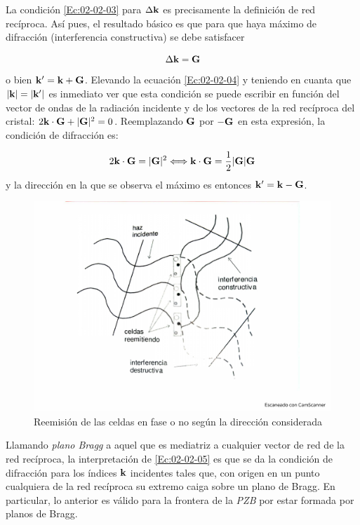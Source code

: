 La condición \ref{Ec:02-02-03} para $\Delta \mathbf{k}$ es precisamente la definición de red recíproca. Así pues, el resultado básico es que para que haya máximo de difracción (interferencia constructiva) se debe satisfacer 


\begin{equation}
    \Delta \mathbf{k} = \mathbf{G}\label{Ec:02-02-04}
\end{equation}
o bien $\mathbf{k}'=\mathbf{k}+\mathbf{G}$. Elevando la ecuación \ref{Ec:02-02-04} y teniendo en cuanta que $|\mathbf{k}|=|\mathbf{k}'|$ es inmediato ver que esta condición se puede escribir en función del vector de ondas de la radiación incidente y de los vectores de la red recíproca del cristal: $2\mathbf{k} \cdot \mathbf{G} + |\mathbf{G}|^2 = 0$. Reemplazando $\mathbf{G}$ por $-\mathbf{G}$ en esta expresión, la condición de difracción es: 

\begin{equation}
    2 \mathbf{k} \cdot \mathbf{G} = |\mathbf{G}|^2 \Longleftrightarrow \mathbf{k} \cdot \mathbf{G} = \frac{1}{2} |\mathbf{G}|  \mathbf{G}\label{Ec:02-02-05}
\end{equation}
y la dirección en la que se observa el máximo es entonces $\mathbf{k}'=\mathbf{k}-\mathbf{G}$. 


\begin{figure}[h!] \centering
    \includegraphics[scale=0.40]{Cuerpo/Ch_02/Fotos_libro 4.pdf}
    \caption{Reemisión de las celdas en fase o no según la dirección considerada}
    \label{Fig:02-04}
\end{figure}

Llamando \textit{plano Bragg} a aquel que es mediatriz a cualquier vector de red de la red recíproca, la interpretación de \ref{Ec:02-02-05} es que se da la condición de difracción para los índices $\mathbf{k}$ incidentes tales que, con origen en un punto cualquiera de la red recíproca su extremo caiga sobre un plano de Bragg. En particular, lo anterior es válido para la frontera de la \textit{PZB} por estar formada por planos de Bragg. 

